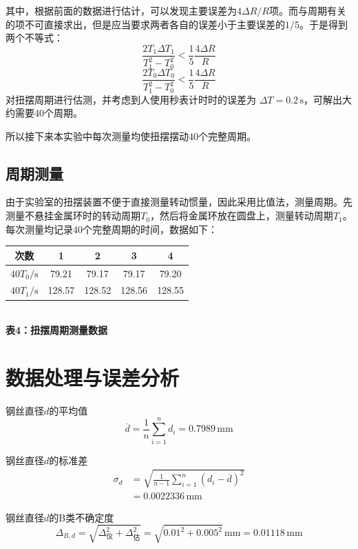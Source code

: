 \documentclass[12pt,a4paper]{article}
\begin{document}
        其中，根据前面的数据进行估计，可以发现主要误差为$4\Delta R/R$项。而与周期有关的项不可直接求出，但是应当要求两者各自的误差小于主要误差的$1/5$。于是得到两个不等式：
        \[
            \frac{2T_1\Delta T_1}{T_1^2 - T_0^2} < \frac{1}{5}\frac{4\Delta R}{R}
        \]
        \[
            \frac{2T_0\Delta T_0}{T_1^2 - T_0^2} < \frac{1}{5}\frac{4\Delta R}{R}
        \]
        对扭摆周期进行估测，并考虑到人使用秒表计时时的误差为 $\Delta T = 0.2\,\mathrm{s}$，可解出大约需要40个周期。
        
        所以接下来本实验中每次测量均使扭摆摆动40个完整周期。
    \subsection{周期测量}
        由于实验室的扭摆装置不便于直接测量转动惯量，因此采用比值法，测量周期。先测量不悬挂金属环时的转动周期$T_0$，然后将金属环放在圆盘上，测量转动周期$T_1$。每次测量均记录40个完整周期的时间，数据如下：
        \begin{center}
            \begin{tabular}{ccccc}
                \toprule
                次数 & 1 & 2 & 3 & 4 \\
                \midrule
                $40T_0/\mathrm{s}$ & 79.21 & 79.17 & 79.17 & 79.20 \\
                $40T_1/\mathrm{s}$ & 128.57 & 128.52 & 128.56 & 128.55 \\
                \bottomrule
            \end{tabular} \\
            \textbf{表4：扭摆周期测量数据}
        \end{center}

\section{数据处理与误差分析}
    钢丝直径$d$的平均值
    \[
        \overline{d}=\frac{1}{n}\sum_{i=1}^{n}d_i=0.7989\,\mathrm{mm}
    \]

    钢丝直径$d$的标准差
    \[
        \begin{aligned}
            \sigma_{d}&=\sqrt{\frac{1}{n-1}\sum_{i=1}^n\left(d_i-\overline{d}\right)^2}\\
            &=0.0022336\,\mathrm{mm}
        \end{aligned}
    \]

    钢丝直径$d$的B类不确定度
    \[
        \Delta_{B,d}=\sqrt{\Delta_\text{仪}^2+\Delta_\text{估}^2}=\sqrt{0.01^2+0.005^2}\,\mathrm{mm}=0.01118\,\mathrm{mm}
    \]
\end{document}
